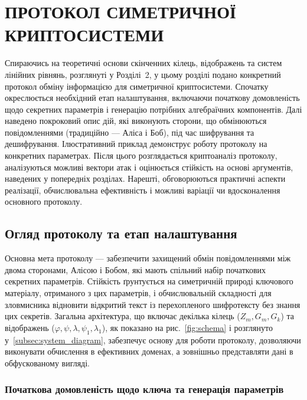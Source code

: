 \chapter{ПРОТОКОЛ СИМЕТРИЧНОЇ КРИПТОСИСТЕМИ}\label{ch:-3:---}

Спираючись на теоретичні основи скінченних кілець, відображень та систем лінійних рівнянь, розглянуті у Розділі~2, у цьому розділі подано конкретний протокол обміну інформацією для симетричної криптосистеми.
Спочатку окреслюється необхідний етап налаштування, включаючи початкову домовленість щодо секретних параметрів і генерацію потрібних алгебраїчних компонентів.
Далі наведено покроковий опис дій, які виконують сторони, що обмінюються повідомленнями (традиційно — Аліса і Боб), під час шифрування та дешифрування.
Ілюстративний приклад демонструє роботу протоколу на конкретних параметрах.
Після цього розглядається криптоаналіз протоколу, аналізуються можливі вектори атак і оцінюється стійкість на основі аргументів, наведених у попередніх розділах.
Нарешті, обговорюються практичні аспекти реалізації, обчислювальна ефективність і можливі варіації чи вдосконалення основного протоколу.


\section{Огляд протоколу та етап налаштування}
\label{sec:protocol_overview}
Основна мета протоколу — забезпечити захищений обмін повідомленнями між двома сторонами, Алісою і Бобом, які мають спільний набір початкових секретних параметрів.
Стійкість ґрунтується на симетричній природі ключового матеріалу, отриманого з цих параметрів, і обчислювальній складності для зловмисника відновити відкритий текст із перехопленого шифротексту без знання цих секретів.
Загальна архітектура, що включає декілька кілець ($Z_m, G_m, G_k$) та відображень ($\varphi, \psi, \lambda, \psi_1, \lambda_1$), як показано на рис.~\ref{fig:schema} і розглянуто у~\ref{subsec:system_diagram}, забезпечує основу для роботи протоколу, дозволяючи виконувати обчислення в ефективних доменах, а зовнішньо представляти дані в обфускованому вигляді.

\subsection{Початкова домовленість щодо ключа та генерація параметрів}
\label{subsec:protocol_setup}

